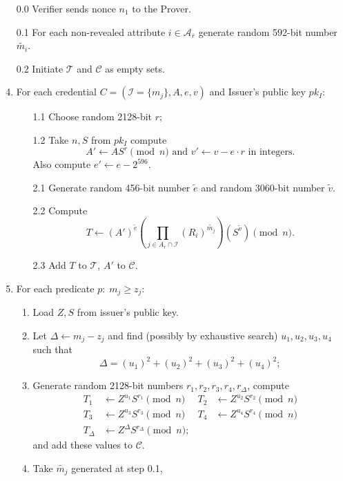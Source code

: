 \documentclass[a4paper]{article}
\begin{document}
  
\begin{enumerate}
\item [0.0] Verifier sends nonce $n_1$ to the Prover.
\item [0.1] For each non-revealed attribute $i\in \mathcal{A}_{\overline{r}}$ generate random 592-bit number $\widetilde{m_i}$.
\item [0.2] Initiate $\mathcal{T}$ and $\mathcal{C}$ as empty sets.
\item For each credential $C = (\mathcal{I}=\{m_j\},A,e,v)$ and Issuer's 
public key $pk_I$:\begin{enumerate}
\item [1.1] Choose random 2128-bit $r$;
\item [1.2] Take $n,S$ from $pk_I$ compute 
\begin{equation}\label{eq:aprime}
A' \leftarrow A S^{r}\pmod{n}
\text{ and } v' \leftarrow v - e\cdot r\text{ in integers.}
\end{equation} 
Also compute $e' \leftarrow e - 2^{596}$.
\item[2.1] Generate random 456-bit number $\widetilde{e}$ and random 3060-bit number $\widetilde{v}$.
\item[2.2] Compute 
$$
T \leftarrow (A')^{\widetilde{e}}\left(\prod_{j\in A_{\overline{r}}\cap \mathcal{I}} (R_i)^{\widetilde{m_j}}\right)(S^{\widetilde{v}})\pmod{n}.
$$
\item[2.3] Add $T$ to $\mathcal{T}$, $A'$ to $\mathcal{C}$.
\end{enumerate}
\item For each predicate $p:\;m_j \geq  z_j$:
\begin{enumerate}
\item Load $Z,S$ from issuer's public key.
\item Let $\Delta \leftarrow m_j - z_j$ and find (possibly by exhaustive search) $u_1, u_2,u_3, u_4$ such
that $$
\Delta = (u_1)^2+ (u_2)^2+ (u_3)^2+ (u_4)^2;
$$
\item Generate random 2128-bit numbers $r_1,r_2,r_3,r_4, r_{\Delta}$, compute
\begin{align}
T_1 &\leftarrow Z^{u_1}S^{r_1}\pmod{n}& 
T_2 &\leftarrow Z^{u_2}S^{r_2}\pmod{n}\\
T_3 &\leftarrow Z^{u_3}S^{r_3}\pmod{n} &
 T_4 &\leftarrow Z^{u_4}S^{r_4}\pmod{n}\\
T_{\Delta} &\leftarrow  Z^{\Delta}S^{r_{\Delta}} \pmod{n};
\end{align}
and add these values to $\mathcal{C}$.
\item Take $\widetilde{m_j}$ generated at step 0.1, 

\end{enumerate}
\end{enumerate}
\end{document}
